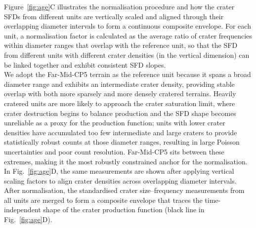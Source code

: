 \documentclass[preprint,11pt,3p,times,authoryear]{elsarticle}
\begin{document}
Figure~\ref{fig:age}C illustrates the normalisation procedure and how the crater SFDs from different units are vertically scaled and aligned through their overlapping diameter intervals to form a continuous composite envelope. For each unit, a normalisation factor is calculated as the average ratio of crater frequencies within diameter ranges that overlap with the reference unit, so that the SFD from different units with different crater densities (in the vertical dimension) can be linked together and exhibit consistent SFD slopes. \\

We adopt the Far-Mid-CP5 terrain as the reference unit because it spans a broad diameter range and exhibits an intermediate crater density, providing stable overlap with both more sparsely and more densely cratered terrains. 
Heavily cratered units are more likely to approach the crater saturation limit, where crater destruction begins to balance production and the SFD shape becomes unreliable as a proxy for the production function; units with lower crater densities have accumulated too few intermediate and large craters to provide statistically robust counts at those diameter ranges, resulting in large Poisson uncertainties and poor count resolution. Far-Mid-CP5 sits between these extremes, making it the most robustly constrained anchor for the normalisation.
In Fig.~\ref{fig:age}D, the same measurements are shown after applying vertical scaling factors to align crater densities across overlapping diameter intervals. After normalisation, the standardised crater size–frequency measurements from all units are merged to form a composite envelope that traces the time-independent shape of the crater production function (black line in Fig.~\ref{fig:age}D). 
%
\end{document}

